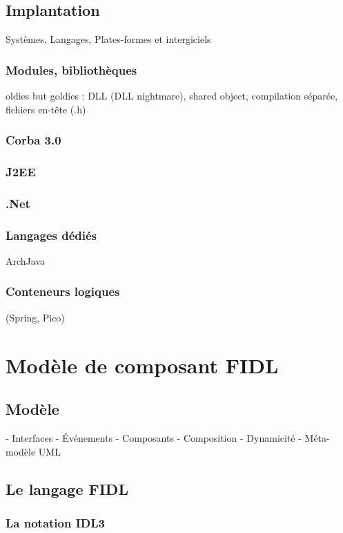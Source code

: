 \documentclass[french,a4paper,leqno,twoside]{book}
\begin{document}
\section{Implantation}

Syst\`emes, Langages, Plates-formes et intergiciels

\subsection{Modules, biblioth\`eques}
oldies but goldies : DLL (DLL nightmare), shared object, compilation
s\'epar\'ee, fichiers en-t\^ete (.h)
\subsection{Corba 3.0}
\subsection{J2EE}
\subsection{.Net}
\subsection{Langages d\'edi\'es}
ArchJava
\subsection{Conteneurs logiques}
 (Spring, Pico)


\chapter{Mod\`ele de composant FIDL}

\section{Mod\`ele}

 - Interfaces 
 - \'Ev\'enements 
 - Composants
 - Composition
 - Dynamicit\'e
 - M\'eta-mod\`ele UML
 
\section{Le langage FIDL}

\subsection{La notation IDL3}
\end{document}
